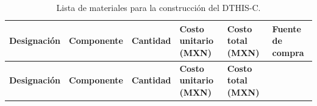 \documentclass[
  letterpaper,
]{scrbook}
\begin{document}
\begin{longtable}[]{@{}
  >{\raggedright\arraybackslash}p{}
  >{\raggedright\arraybackslash}p{}
  >{\raggedright\arraybackslash}p{}
  >{\raggedright\arraybackslash}p{}
  >{\raggedright\arraybackslash}p{}
  >{\raggedright\arraybackslash}p{}@{}}
\caption{Lista de materiales para la construcción del
DTHIS-C.}\label{tbl-materiales}\tabularnewline
\toprule\noalign{}
\begin{minipage}[b]{\linewidth}\raggedright
\textbf{Designación}
\end{minipage} & \begin{minipage}[b]{\linewidth}\raggedright
\textbf{Componente}
\end{minipage} & \begin{minipage}[b]{\linewidth}\raggedright
\textbf{Cantidad}
\end{minipage} & \begin{minipage}[b]{\linewidth}\raggedright
\textbf{Costo unitario (MXN)}
\end{minipage} & \begin{minipage}[b]{\linewidth}\raggedright
\textbf{Costo total (MXN)}
\end{minipage} & \begin{minipage}[b]{\linewidth}\raggedright
\textbf{Fuente de compra}
\end{minipage} \\
\midrule\noalign{}
\endfirsthead
\toprule\noalign{}
\begin{minipage}[b]{\linewidth}\raggedright
\textbf{Designación}
\end{minipage} & \begin{minipage}[b]{\linewidth}\raggedright
\textbf{Componente}
\end{minipage} & \begin{minipage}[b]{\linewidth}\raggedright
\textbf{Cantidad}
\end{minipage} & \begin{minipage}[b]{\linewidth}\raggedright
\textbf{Costo unitario (MXN)}
\end{minipage} & \begin{minipage}[b]{\linewidth}\raggedright
\textbf{Costo total (MXN)}
\end{minipage} & \begin{minipage}[b]{\linewidth}\raggedright

\end{minipage}
\end{longtable}
\end{document}
